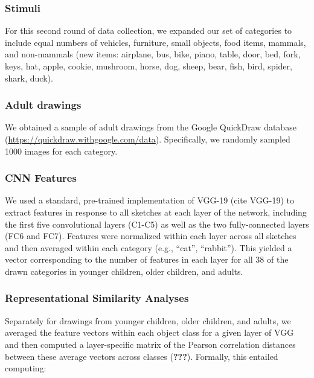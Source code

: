 \documentclass[10pt, letterpaper]{article}
\begin{document}
\subsubsection{Stimuli}\label{stimuli-1}

For this second round of data collection, we expanded our set of
categories to include equal numbers of vehicles, furniture, small
objects, food items, mammals, and non-mammals (new items: airplane, bus,
bike, piano, table, door, bed, fork, keys, hat, apple, cookie, mushroom,
horse, dog, sheep, bear, fish, bird, spider, shark, duck).

\subsubsection{Adult drawings}\label{adult-drawings}

We obtained a sample of adult drawings from the Google QuickDraw
database (\url{https://quickdraw.withgoogle.com/data}). Specifically, we
randomly sampled 1000 images for each category.

\subsubsection{CNN Features}\label{cnn-features}

We used a standard, pre-trained implementation of VGG-19 (cite VGG-19)
to extract features in response to all sketches at each layer of the
network, including the first five convolutional layers (C1-C5) as well
as the two fully-connected layers (FC6 and FC7). Features were
normalized within each layer across all sketches and then averaged
within each category (e.g., ``cat'', ``rabbit''). This yielded a vector
corresponding to the number of features in each layer for all 38 of the
drawn categories in younger children, older children, and adults.

\subsubsection{Representational Similarity
Analyses}\label{representational-similarity-analyses}

Separately for drawings from younger children, older children, and
adults, we averaged the feature vectors within each object class for a
given layer of VGG and then computed a layer-specific matrix of the
Pearson correlation distances between these average vectors across
classes ({\textbf{???}}). Formally, this entailed computing:
\end{document}
